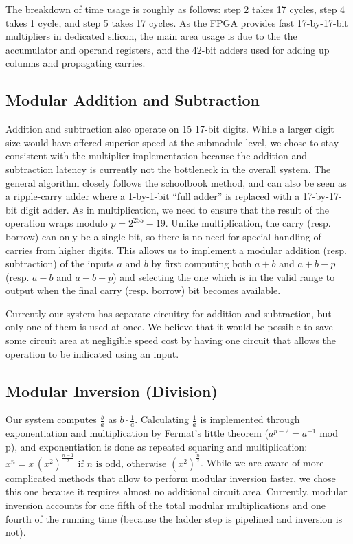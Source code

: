 The breakdown of time usage is roughly as follows: step 2 takes 17
cycles, step 4 takes 1 cycle, and step 5 takes 17 cycles. As the FPGA
provides fast 17-by-17-bit multipliers in dedicated silicon, the main
area usage is due to the the accumulator and operand registers, and the
42-bit adders used for adding up columns and propagating carries.

\subsection{Modular Addition and
Subtraction}\label{modular-addition-and-subtraction}

Addition and subtraction also operate on 15 17-bit digits. While a
larger digit size would have offered superior speed at the submodule
level, we chose to stay consistent with the multiplier implementation
because the addition and subtraction latency is currently not the
bottleneck in the overall system. The general algorithm closely follows
the schoolbook method, and can also be seen as a ripple-carry adder
where a 1-by-1-bit ``full adder'' is replaced with a 17-by-17-bit digit
adder. As in multiplication, we need to ensure that the result of the
operation wraps modulo \(p=2^{255}-19\). Unlike multiplication, the
carry (resp. borrow) can only be a single bit, so there is no need for
special handling of carries from higher digits. This allows us to
implement a modular addition (resp. subtraction) of the inputs \(a\) and
\(b\) by first computing both \(a+b\) and \(a+b-p\) (resp. \(a-b\) and
\(a-b+p\)) and selecting the one which is in the valid range to output
when the final carry (resp. borrow) bit becomes available.

Currently our system has separate circuitry for addition and
subtraction, but only one of them is used at once. We believe that it
would be possible to save some circuit area at negligible speed cost by
having one circuit that allows the operation to be indicated using an
input.

\subsection{Modular Inversion
(Division)}\label{modular-inversion-division}

Our system computes \(\frac{b}{a}\) as \(b\cdot\frac{1}{a}\).
Calculating \(\frac{1}{a}\) is implemented through exponentiation and
multiplication by Fermat's little theorem (\(a^{p-2} = a^{-1}\) mod p),
and exponentiation is done as repeated squaring and multiplication:
\(x^n= x \, ( x^{2})^{\frac{n - 1}{2}} \mbox{ if } n \mbox{ is odd, otherwise } (x^{2})^{\frac{n}{2}}\).
While we are aware of more complicated methods that allow to perform
modular inversion faster, we chose this one because it requires almost
no additional circuit area. Currently, modular inversion accounts for
one fifth of the total modular multiplications and one fourth of the
running time (because the ladder step is pipelined and inversion is
not).

